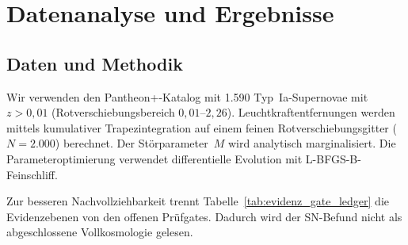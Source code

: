 \documentclass[aps,prd,twocolumn,superscriptaddress,nofootinbib]{revtex4-2}
\begin{document}
\section{Datenanalyse und Ergebnisse}
\label{sec:analysis}

\subsection{Daten und Methodik}

Wir verwenden den Pantheon+-Katalog \cite{Scolnic2022} mit 1.590 Typ~Ia-Supernovae mit $z > 0{,}01$ (Rotverschiebungsbereich $0{,}01$--$2{,}26$). Leuchtkraftentfernungen werden mittels kumulativer Trapezintegration auf einem feinen Rotverschiebungsgitter ($N = 2.000$) berechnet. Der St\"orparameter~$M$ wird analytisch marginalisiert. Die Parameteroptimierung verwendet differentielle Evolution mit L-BFGS-B-Feinschliff.

Zur besseren Nachvollziehbarkeit trennt Tabelle~\ref{tab:evidenz_gate_ledger} die Evidenzebenen von den offenen Prüfgates. Dadurch wird der SN-Befund nicht als abgeschlossene Vollkosmologie gelesen.
\end{document}

